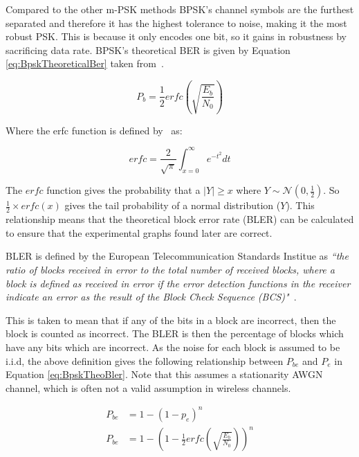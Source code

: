 \documentclass[12pt,onecolumn,letterpaper]{article}
\begin{document}
Compared to the other m-PSK methods BPSK's channel symbols are the furthest separated and therefore it has the highest tolerance to noise, making it the most robust PSK. This is because it only encodes one bit, so it gains in robustness by sacrificing data rate. BPSK's theoretical BER is given by Equation \ref{eq:BpskTheoreticalBer} taken from~\cite{BpskPe}.

\begin{equation}
   P_b = \frac{1}{2}erfc\left(\sqrt{\frac{E_b}{N_0}}\right)
   \label{eq:BpskTheoreticalBer}
\end{equation}

Where the erfc function is defined by~\cite{ErfcDefinition} as:

\begin{equation}
   erfc = \frac{2}{\sqrt{\pi}}\int_{x=0}^{\infty}e^{-t^2}dt
   \label{eq:ErfcDef}
\end{equation}

The $erfc$ function gives the probability that a $\left| Y \right| \ge x$ where $Y \sim \mathcal{N}(0,\frac{1}{2})$. So $\frac{1}{2}\times erfc(x)$ gives the tail probability of a normal distribution ($Y$). This relationship means that the theoretical block error rate (BLER) can be calculated to ensure that the experimental graphs found later are correct.

BLER is defined by the European Telecommunication Standards Institue as \textit{``the ratio of blocks received in error to the total number of received blocks, where a block is defined as received in error if the error detection functions in the receiver indicate an error as the result of the Block Check Sequence (BCS)"}~\cite{BlerEtsiDefinition}.

This is taken to mean that if any of the bits in a block are incorrect, then the block is counted as incorrect. The BLER is then the percentage of blocks which have any bits which are incorrect. As the noise for each block is assumed to be i.i.d, the above definition gives the following relationship between $P_{be}$ and $P_e$ in Equation \ref{eq:BpskTheoBler}. Note that this assumes a stationarity AWGN channel, which is often not a valid assumption in wireless channels.

\begin{align}
   P_{be} &= 1 - (1-p_e)^n \\
   P_{be} &= 1 - \left(1-\frac{1}{2}erfc\left(\sqrt{\frac{E_b}{N_0}}\right)\right)^n
   \label{eq:BpskTheoBler}
\end{align}
\end{document}
